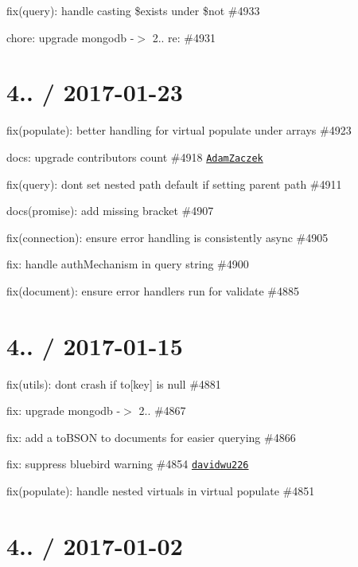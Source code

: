 \begin{DoxyItemize}
\item fix(query)\+: handle casting \$exists under \$not \#4933
\item chore\+: upgrade mongodb -\/$>$ 2.. re\+: \#4931
\end{DoxyItemize}

\section*{4.. / 2017-\/01-\/23 }


\begin{DoxyItemize}
\item fix(populate)\+: better handling for virtual populate under arrays \#4923
\item docs\+: upgrade contributors count \#4918 \href{https://github.com/AdamZaczek}{\tt Adam\+Zaczek}
\item fix(query)\+: don\textquotesingle{}t set nested path default if setting parent path \#4911
\item docs(promise)\+: add missing bracket \#4907
\item fix(connection)\+: ensure error handling is consistently async \#4905
\item fix\+: handle auth\+Mechanism in query string \#4900
\item fix(document)\+: ensure error handlers run for validate \#4885
\end{DoxyItemize}

\section*{4.. / 2017-\/01-\/15 }


\begin{DoxyItemize}
\item fix(utils)\+: don\textquotesingle{}t crash if to\mbox{[}key\mbox{]} is null \#4881
\item fix\+: upgrade mongodb -\/$>$ 2.. \#4867
\item fix\+: add a to\+B\+S\+ON to documents for easier querying \#4866
\item fix\+: suppress bluebird warning \#4854 \href{https://github.com/davidwu226}{\tt davidwu226}
\item fix(populate)\+: handle nested virtuals in virtual populate \#4851
\end{DoxyItemize}

\section*{4.. / 2017-\/01-\/02 }



